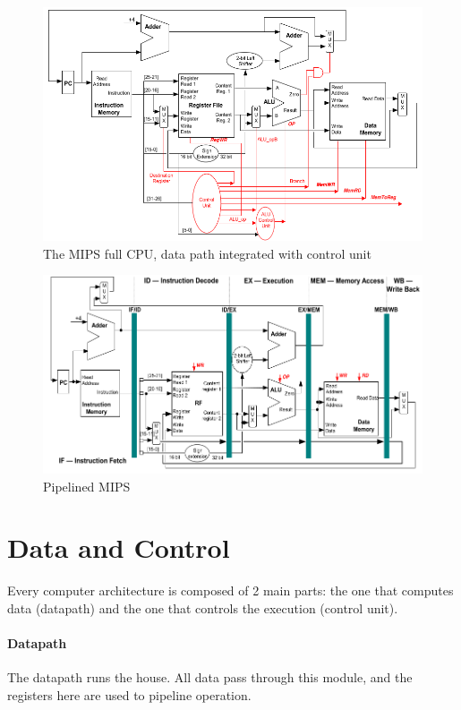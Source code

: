 \documentclass[10pt,a4paper]{article}
\begin{document}
				\begin{figure}[H]
					\centering
					\includegraphics[width = \textwidth]{./images/MIPSCPU.png}
					\caption{The MIPS full CPU, data path integrated with control unit}
				\end{figure}
				
				\begin{figure}[H]
					\centering
					\includegraphics[width = \textwidth]{./images/MIPSCPUPIPELINED.png}
					\caption{Pipelined MIPS}
				\end{figure}
				
				
		\section{Data and Control}
			Every computer architecture is composed of 2 main parts: the one that computes data (datapath) and the one that controls the execution (control unit).
			
			\paragraph{Datapath}
				The datapath runs the house. All data pass through this module, and the registers here are used to pipeline operation.
			
\end{document}

